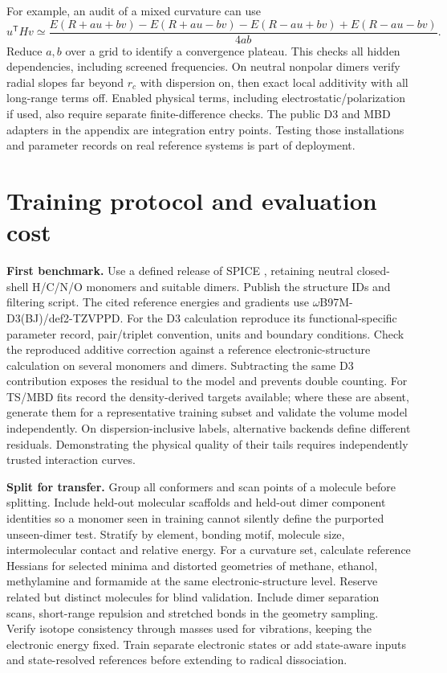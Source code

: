 \documentclass[11pt,a4paper]{article}
\newcommand{\T}{\mathsf T}\newcommand{\tr}{\operatorname{tr}}
\begin{document}
For example, an audit of a mixed curvature can use
\[
 u^\T H v \simeq
 \frac{E(R+au+bv)-E(R+au-bv)-E(R-au+bv)+E(R-au-bv)}{4ab}.
\]
Reduce $a,b$ over a grid to identify a convergence plateau. This checks all hidden dependencies, including screened frequencies. On neutral nonpolar dimers verify radial slopes far beyond $r_c$ with dispersion on, then exact local additivity with all long-range terms off. Enabled physical terms, including electrostatic/polarization if used, also require separate finite-difference checks. The public D3 and MBD adapters in the appendix are integration entry points. Testing those installations and parameter records on real reference systems is part of deployment.
\pg\section{Training protocol and evaluation cost}
\textbf{First benchmark.} Use a defined release of SPICE \cite{spice}, retaining neutral closed-shell H/C/N/O monomers and suitable dimers. Publish the structure IDs and filtering script. The cited reference energies and gradients use $\omega$B97M-D3(BJ)/def2-TZVPPD. For the D3 calculation reproduce its functional-specific parameter record, pair/triplet convention, units and boundary conditions. Check the reproduced additive correction against a reference electronic-structure calculation on several monomers and dimers. Subtracting the same D3 contribution exposes the residual to the model and prevents double counting. For TS/MBD fits record the density-derived targets available; where these are absent, generate them for a representative training subset and validate the volume model independently. On dispersion-inclusive labels, alternative backends define different residuals. Demonstrating the physical quality of their tails requires independently trusted interaction curves.

\textbf{Split for transfer.} Group all conformers and scan points of a molecule before splitting. Include held-out molecular scaffolds and held-out dimer component identities so a monomer seen in training cannot silently define the purported unseen-dimer test. Stratify by element, bonding motif, molecule size, intermolecular contact and relative energy. For a curvature set, calculate reference Hessians for selected minima and distorted geometries of methane, ethanol, methylamine and formamide at the same electronic-structure level. Reserve related but distinct molecules for blind validation. Include dimer separation scans, short-range repulsion and stretched bonds in the geometry sampling. Verify isotope consistency through masses used for vibrations, keeping the electronic energy fixed. Train separate electronic states or add state-aware inputs and state-resolved references before extending to radical dissociation.
\end{document}
